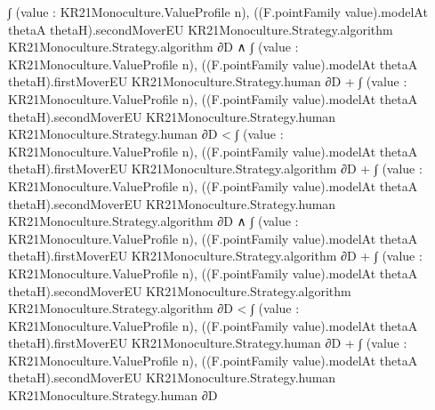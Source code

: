 \documentclass[10pt]{article}
\begin{document}
\begin{ReviewVerbatim}
                              ∫ (value : KR21Monoculture.ValueProfile n),
                                ((F.pointFamily value).modelAt thetaA thetaH).secondMoverEU
                                  KR21Monoculture.Strategy.algorithm KR21Monoculture.Strategy.algorithm ∂D ∧
                          ∫ (value : KR21Monoculture.ValueProfile n),
                                  ((F.pointFamily value).modelAt thetaA thetaH).firstMoverEU
                                    KR21Monoculture.Strategy.human ∂D +
                                ∫ (value : KR21Monoculture.ValueProfile n),
                                  ((F.pointFamily value).modelAt thetaA thetaH).secondMoverEU
                                    KR21Monoculture.Strategy.human KR21Monoculture.Strategy.human ∂D <
                              ∫ (value : KR21Monoculture.ValueProfile n),
                                  ((F.pointFamily value).modelAt thetaA thetaH).firstMoverEU
                                    KR21Monoculture.Strategy.algorithm ∂D +
                                ∫ (value : KR21Monoculture.ValueProfile n),
                                  ((F.pointFamily value).modelAt thetaA thetaH).secondMoverEU
                                    KR21Monoculture.Strategy.human KR21Monoculture.Strategy.algorithm ∂D ∧
                            ∫ (value : KR21Monoculture.ValueProfile n),
                                  ((F.pointFamily value).modelAt thetaA thetaH).firstMoverEU
                                    KR21Monoculture.Strategy.algorithm ∂D +
                                ∫ (value : KR21Monoculture.ValueProfile n),
                                  ((F.pointFamily value).modelAt thetaA thetaH).secondMoverEU
                                    KR21Monoculture.Strategy.algorithm KR21Monoculture.Strategy.algorithm ∂D <
                              ∫ (value : KR21Monoculture.ValueProfile n),
                                  ((F.pointFamily value).modelAt thetaA thetaH).firstMoverEU
                                    KR21Monoculture.Strategy.human ∂D +
                                ∫ (value : KR21Monoculture.ValueProfile n),
                                  ((F.pointFamily value).modelAt thetaA thetaH).secondMoverEU
                                    KR21Monoculture.Strategy.human KR21Monoculture.Strategy.human ∂D
\end{ReviewVerbatim}
\end{document}
